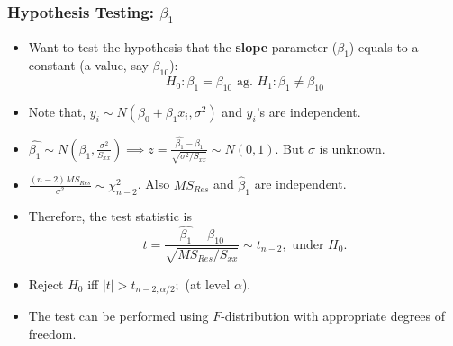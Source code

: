 \documentclass[10pt]{beamer} %
\begin{document}
\begin{frame}
	\frametitle{Hypothesis Testing: $\beta_1$ }
\begin{itemize}
%
\item Want to test the hypothesis that the \textbf{slope} parameter ($\beta_1$) equals to a constant (a value, say $\beta_{10}$):
$$H_0: \beta_1 = \beta_{10} \mbox{ ag. } H_1: \beta_1 \neq \beta_{10} $$

\item Note that, $y_i \sim N(\beta_0 + \beta_1 x_i, \sigma^2)$ and $y_i$'s are independent. 
\vspace{0.2cm}

\item $\hat{\beta_1} \sim N(\beta_1, \frac{\sigma^2}{S_{xx}}) \implies z = \frac{\hat{\beta_1} - \beta_1}{\sqrt{\sigma^2/S_{xx}}} \sim N(0, 1)$. But $\sigma$ is unknown. 
\vspace{0.2cm}

\item $\frac{(n-2) MS_{Res}}{\sigma^2} \sim \chi_{n-2}^2$. Also $MS_{Res}$ and $\hat\beta_1$ are independent. 
\vspace{0.2cm}

\item Therefore, the test statistic is 
$$t = \frac{\hat{\beta_1} - \beta_{10}}{\sqrt{MS_{Res}/S_{xx}}} \sim t_{n-2}, \mbox{ under } H_0.  $$

\item Reject $H_0$ iff $|t| > t_{n-2, \alpha/2};$ (at level $\alpha$). 
\item The test can be performed using $F$-distribution with appropriate degrees
   of freedom.
\end{itemize}	

\end{frame}
\end{document}
